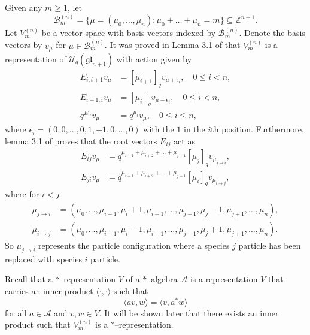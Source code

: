 \documentclass{ximera}
\begin{document}
Given any $m \geq 1$, let 
$$\mathcal{B}_m^{(n)} = \{\mu = (\mu_0,\ldots,\mu_n): \mu_0+\ldots+\mu_n=m\} \subseteq \mathbb{Z}^{n+1}.$$
Let $V^{(n)}_m$ be a vector space with basis vectors indexed by $\mathcal{B}_m^{(n)}$. Denote the basis vectors by $v_{\mu}$ for $\mu \in \mathcal{B}_m^{(n)}$. It was proved in Lemma 3.1 of \cite{Kuan-IMRN} that  $V^{(n)}_m$ is a representation of $\mathcal{U}_q(\mathfrak{gl}_{n+1})$ with action given by 
\begin{align*}
E_{i,i+1} v_{\mu} &= [\mu_{i+1}]_q v_{ \mu + \epsilon_i}, \quad 0 \leq i < n, \\
E_{i+1,i}v_{\mu}  &= [\mu_{i}]_q v_{\mu - \epsilon_i},\quad 0 \leq i < n, \\
q^{E_{ii}} v_{\mu} &= q^{\mu_i} v_{\mu}, \quad 0 \leq i \leq n,
\end{align*}
where $\epsilon_i = (0,0,\ldots,0,1,-1,0,\ldots,0)$ with the $1$ in the $i$th position. Furthermore, lemma 3.1 of \cite{Kuan-IMRN} proves that the root vectors $E_{ij}$ act as
\begin{equation}\label{Act}
\begin{aligned} E_{i j} v_{\mu} &=q^{\mu_{i+1}+\mu_{i+2}+\ldots+\mu_{j-1}}\left[\mu_{j}\right]_{q} v_{\mu_{j \rightarrow i}}, \\ E_{j i} v_{\mu} &=q^{\mu_{i+1}+\mu_{i+2}+\ldots+\mu_{j-1}}\left[\mu_{i}\right]_{q} v_{\mu_{i \rightarrow j}}, \end{aligned}
\end{equation}
where for $i<j$
\begin{equation*}
\begin{aligned} \mu_{j \rightarrow i} &=\left(\mu_{0}, \ldots, \mu_{i-1}, \mu_{i}+1, \mu_{i+1}, \ldots, \mu_{j-1}, \mu_{j}-1, \mu_{j+1}, \ldots, \mu_{n}\right), \\ \mu_{i \rightarrow j} &=\left(\mu_{0}, \ldots, \mu_{i-1}, \mu_{i}-1, \mu_{i+1}, \ldots, \mu_{j-1}, \mu_{j}+1, \mu_{j+1}, \ldots, \mu_{n}\right).\end{aligned}
\end{equation*}
So $\mu_{j\rightarrow i}$ represents the particle configuration where a species $j$  particle has been replaced with species $i$ 
particle.

Recall that a $*$--representation $V$ of a $*$--algebra $\mathcal{A}$ is a representation $V$ that carries an inner product $\langle \cdot, \cdot \rangle$ such that
$$
\langle av,w\rangle = \langle v,a^*w\rangle
$$
for all $a\in \mathcal{A}$ and $v,w\in V$. It will be shown later that there exists an inner product such that $V_m^{(n)}$ is a $*$--representation.
\end{document}
